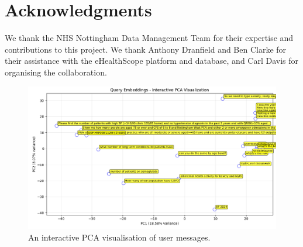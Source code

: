 \documentclass[11pt]{article}
\begin{document}


\section*{Acknowledgments}
We thank the NHS Nottingham Data Management Team for their expertise and contributions to this project. We thank Anthony Dranfield and Ben Clarke for their assistance with the eHealthScope platform and database, and Carl Davis for organising the collaboration.



\appendix


\begin{figure}[b]
  \includegraphics[width=\linewidth]{content/pca_09_16_randomly_sampled_20.png}
  \caption{
    An interactive PCA visualisation of user messages.
  }
  \label{fig:sample-user-utterances}
\end{figure}


\end{document}
